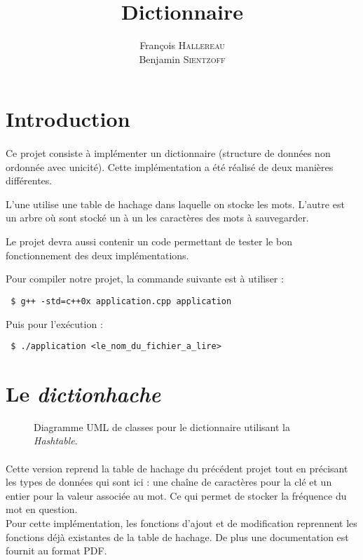 \documentclass[12pt,a4paper,final]{article}
\author{François \textsc{Hallereau} \\ Benjamin \textsc{Sientzoff}}
\title{Dictionnaire}
\begin{document}
\maketitle

\vspace{5cm}

\tableofcontents

\newpage

\section*{Introduction}
\paragraph{}{
Ce projet consiste à implémenter un dictionnaire (structure de données non ordonnée avec unicité). Cette implémentation a été réalisé de deux manières différentes. 

L'une utilise une table de hachage dans laquelle on stocke les mots. L'autre est un arbre où sont stocké un à un les caractères des mots à sauvegarder.

Le projet devra aussi contenir un code permettant de tester le bon fonctionnement des deux implémentations.

Pour compiler notre projet, la commande suivante est à utiliser :
\begin{verbatim}
 $ g++ -std=c++0x application.cpp application
\end{verbatim}

Puis pour l'exécution :
\begin{verbatim}
 $ ./application <le_nom_du_fichier_a_lire>
\end{verbatim}
}


\newpage

\section{Le \emph{dictionhache}}

		\begin{figure}[h]
			\hspace{-1.8cm}
			
			\caption{Diagramme UML de classes pour le dictionnaire utilisant la \emph{Hashtable}.}
			\label{hashtable_uml}
		\end{figure}
		
	\paragraph{}{Cette version reprend la table de hachage du précédent projet tout en précisant les types de données qui sont ici : une chaîne de caractères pour la clé et un entier pour la valeur associée au mot. Ce qui permet de stocker la fréquence du mot en question. \\
Pour cette implémentation, les fonctions d'ajout et de modification reprennent les fonctions déjà existantes de la table de hachage. De plus une documentation est fournit au format PDF.}
\end{document}
